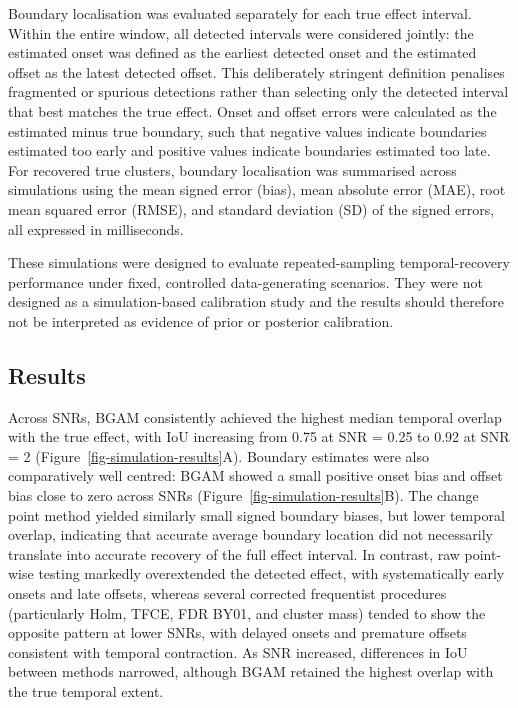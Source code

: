 \documentclass[
  doc,
  floatsintext,
  longtable,
  a4paper,
  nolmodern,
  notxfonts,
  notimes,
  colorlinks=true,linkcolor=blue,citecolor=blue,urlcolor=blue]{apa7}
\begin{document}
Boundary localisation was evaluated separately for each true effect
interval. Within the entire window, all detected intervals were
considered jointly: the estimated onset was defined as the earliest
detected onset and the estimated offset as the latest detected offset.
This deliberately stringent definition penalises fragmented or spurious
detections rather than selecting only the detected interval that best
matches the true effect. Onset and offset errors were calculated as the
estimated minus true boundary, such that negative values indicate
boundaries estimated too early and positive values indicate boundaries
estimated too late. For recovered true clusters, boundary localisation
was summarised across simulations using the mean signed error (bias),
mean absolute error (MAE), root mean squared error (RMSE), and standard
deviation (SD) of the signed errors, all expressed in milliseconds.

These simulations were designed to evaluate repeated-sampling
temporal-recovery performance under fixed, controlled data-generating
scenarios. They were not designed as a simulation-based calibration
study and the results should therefore not be interpreted as evidence of
prior or posterior calibration.

\subsection{Results}\label{results}

Across SNRs, BGAM consistently achieved the highest median temporal
overlap with the true effect, with IoU increasing from 0.75 at SNR =
0.25 to 0.92 at SNR = 2 (Figure~\ref{fig-simulation-results}A). Boundary
estimates were also comparatively well centred: BGAM showed a small
positive onset bias and offset bias close to zero across SNRs
(Figure~\ref{fig-simulation-results}B). The change point method yielded
similarly small signed boundary biases, but lower temporal overlap,
indicating that accurate average boundary location did not necessarily
translate into accurate recovery of the full effect interval. In
contrast, raw point-wise testing markedly overextended the detected
effect, with systematically early onsets and late offsets, whereas
several corrected frequentist procedures (particularly Holm, TFCE, FDR
BY01, and cluster mass) tended to show the opposite pattern at lower
SNRs, with delayed onsets and premature offsets consistent with temporal
contraction. As SNR increased, differences in IoU between methods
narrowed, although BGAM retained the highest overlap with the true
temporal extent.
\end{document}
